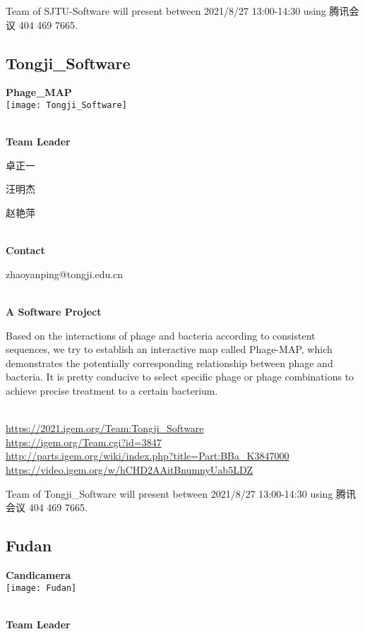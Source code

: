Team of SJTU-Software will present between 2021/8/27 13:00-14:30        using 腾讯会议 404 469 7665.
\newpage


\subsection{\textcolor{Blu}{ Tongji\_Software } }
\vspace{5mm}
\begin{center}
\large{
  \textbf{ Phage_MAP }\\
  \texttt{[image: Tongji\_Software]}
}
\end{center}
\textbf{\\Team Leader}

  卓正一

  汪明杰

  赵艳萍


\textbf{\\Contact}

  zhaoyanping@tongji.edu.cn


\textbf{\\A Software Project\\}\begin{spacing}{1.5}

Based on the interactions of phage and bacteria according to consistent sequences, we try to establish an interactive map called Phage-MAP, which demonstrates the potentially corresponding relationship between phage and bacteria. It is pretty conducive to select specific phage or phage combinations to achieve precise treatment to a certain bacterium.\end{spacing}
\\

\url{https://2021.igem.org/Team:Tongji\_Software }\\
\url{https://igem.org/Team.cgi?id=3847 }\\
\url{http://parts.igem.org/wiki/index.php?title=Part:BBa_K3847000 }\\
\url{https://video.igem.org/w/hCHD2AAitBnumnyUab5LDZ }\\

\vfill{}









Team of Tongji\_Software will present between 2021/8/27 13:00-14:30        using 腾讯会议 404 469 7665.
\newpage


\subsection{\textcolor{Blu}{ Fudan } }
\vspace{5mm}
\begin{center}
\large{
  \textbf{ Candicamera }\\
  \texttt{[image: Fudan]}
}
\end{center}
\textbf{\\Team Leader}

